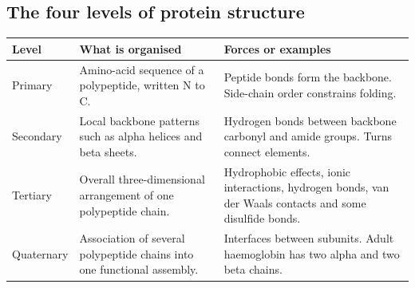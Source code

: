 \documentclass[12pt,a4paper]{article}
\begin{document}
\subsection{The four levels of protein structure}
\par\vspace{5pt}
\begingroup
\setlength{\extrarowheight}{1pt}
\noindent\begin{tabularx}{\linewidth}{|B{3.1cm}|Y|Y|}
\hline
\textbf{Level} & \textbf{What is organised} & \textbf{Forces or examples} \\ \hline
Primary & Amino-acid sequence of a polypeptide, written N to C. & Peptide bonds form the backbone. Side-chain order constrains folding. \\ \hline
Secondary & Local backbone patterns such as alpha helices and beta sheets. & Hydrogen bonds between backbone carbonyl and amide groups. Turns connect elements. \\ \hline
Tertiary & Overall three-dimensional arrangement of one polypeptide chain. & Hydrophobic effects, ionic interactions, hydrogen bonds, van der Waals contacts and some disulfide bonds. \\ \hline
Quaternary & Association of several polypeptide chains into one functional assembly. & Interfaces between subunits. Adult haemoglobin has two alpha and two beta chains. \\ \hline
\end{tabularx}\par
\endgroup
\begin{tcolorbox}[tikzbox, title={Read protein structure by scale}]
\centering
{}\par
\end{tcolorbox}
\end{document}
